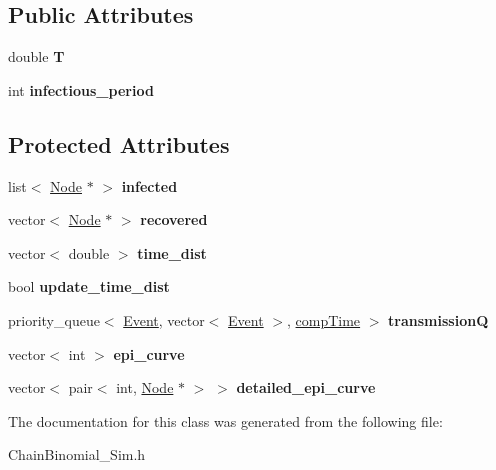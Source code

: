 \subsection*{Public Attributes}
\begin{DoxyCompactItemize}
\item 
\hypertarget{classChainBinomial__Sim_a17cd2e68f958b9b818dc061221dca6cb}{}double {\bfseries T}\label{classChainBinomial__Sim_a17cd2e68f958b9b818dc061221dca6cb}

\item 
\hypertarget{classChainBinomial__Sim_a94ddda2a0fa2a307e094e555d739b3e0}{}int {\bfseries infectious\+\_\+period}\label{classChainBinomial__Sim_a94ddda2a0fa2a307e094e555d739b3e0}

\end{DoxyCompactItemize}
\subsection*{Protected Attributes}
\begin{DoxyCompactItemize}
\item 
\hypertarget{classChainBinomial__Sim_a28b17a028f8540dd8c9eea9b4afd8dc3}{}list$<$ \hyperlink{classNode}{Node} $\ast$ $>$ {\bfseries infected}\label{classChainBinomial__Sim_a28b17a028f8540dd8c9eea9b4afd8dc3}

\item 
\hypertarget{classChainBinomial__Sim_a6f871e9e85e4dbf5dd8704d8e114adc9}{}vector$<$ \hyperlink{classNode}{Node} $\ast$ $>$ {\bfseries recovered}\label{classChainBinomial__Sim_a6f871e9e85e4dbf5dd8704d8e114adc9}

\item 
\hypertarget{classChainBinomial__Sim_a3bf87d7371bb0d354ef9d8fe19c2ba50}{}vector$<$ double $>$ {\bfseries time\+\_\+dist}\label{classChainBinomial__Sim_a3bf87d7371bb0d354ef9d8fe19c2ba50}

\item 
\hypertarget{classChainBinomial__Sim_a897837a54e9fccf9b6b8e4c0d4d66ca9}{}bool {\bfseries update\+\_\+time\+\_\+dist}\label{classChainBinomial__Sim_a897837a54e9fccf9b6b8e4c0d4d66ca9}

\item 
\hypertarget{classChainBinomial__Sim_ae0b621ed8981260be2c0b77587f847cc}{}priority\+\_\+queue$<$ \hyperlink{classEvent}{Event}, vector$<$ \hyperlink{classEvent}{Event} $>$, \hyperlink{classcompTime}{comp\+Time} $>$ {\bfseries transmission\+Q}\label{classChainBinomial__Sim_ae0b621ed8981260be2c0b77587f847cc}

\item 
\hypertarget{classChainBinomial__Sim_a78b56d1a4485d37390fc017715763381}{}vector$<$ int $>$ {\bfseries epi\+\_\+curve}\label{classChainBinomial__Sim_a78b56d1a4485d37390fc017715763381}

\item 
\hypertarget{classChainBinomial__Sim_a321ab6e9f586ec9013f2cc8ecd1cf03b}{}vector$<$ pair$<$ int, \hyperlink{classNode}{Node} $\ast$ $>$ $>$ {\bfseries detailed\+\_\+epi\+\_\+curve}\label{classChainBinomial__Sim_a321ab6e9f586ec9013f2cc8ecd1cf03b}

\end{DoxyCompactItemize}


The documentation for this class was generated from the following file\+:\begin{DoxyCompactItemize}
\item 
Chain\+Binomial\+\_\+\+Sim.\+h\end{DoxyCompactItemize}
